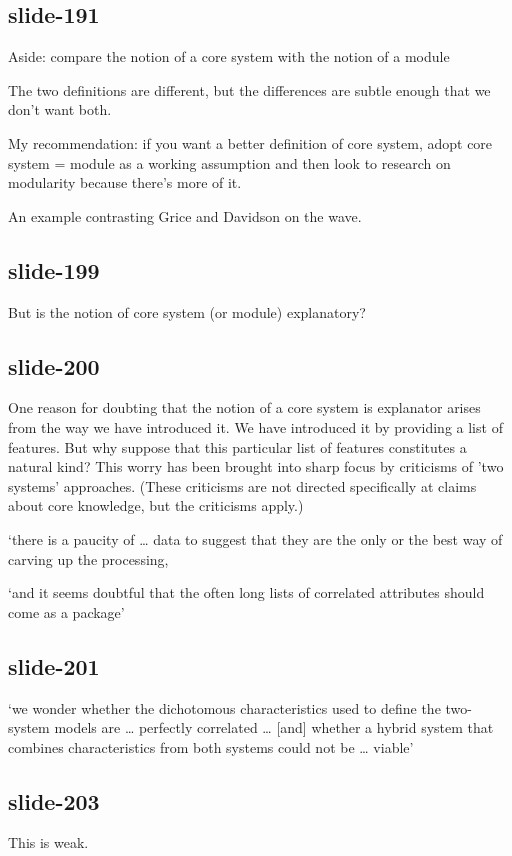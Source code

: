 \documentclass[12pt,\papersize]{extarticle}
\begin{document}
\subsection{slide-191}
Aside: compare the notion of a core system with the notion of a module
 
The two definitions are different, but the differences are subtle enough that we don't want both.
 
My recommendation: if you want a better definition of core system, adopt core system = module as a working assumption and then look to research on modularity because there's more of it.
 
An example contrasting Grice and Davidson on the wave.
 
\subsection{slide-199}
But is the notion of core system (or module) explanatory?
 
\subsection{slide-200}
One reason for doubting that the notion of a core system is explanator arises from the 
way we have introduced it.
We have introduced it by providing a list of features.
But why suppose that this particular list of features constitutes a natural kind?
This worry has been brought into sharp focus by criticisms of 'two systems' approaches.
(These criticisms are not directed specifically at claims about core knowledge, but the criticisms apply.)
 
‘there is a paucity of … data to suggest that they are the only or the best way of carving up the processing,
 
‘and it seems doubtful that the often long lists of correlated attributes should come as a package’
\citep[p.\ 759]{adolphs_conceptual_2010}
 
\subsection{slide-201}
‘we wonder whether the dichotomous characteristics used to define the two-system models are … perfectly correlated …
[and] whether a hybrid system that combines characteristics from both systems could not be … viable’
\citep[p.\ 537]{keren_two_2009}
 
\subsection{slide-203}
This is weak.
 
\end{document}
